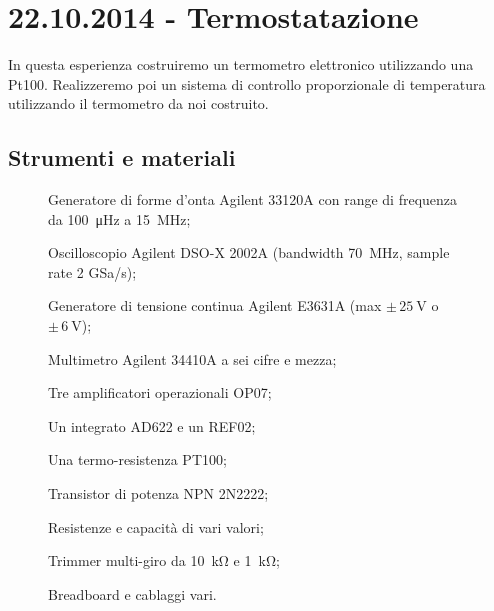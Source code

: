 \section{22.10.2014 - Termostatazione}

In questa esperienza costruiremo un termometro elettronico utilizzando una Pt100. Realizzeremo poi un sistema di controllo proporzionale di temperatura utilizzando il termometro da noi costruito. 

\subsection*{Strumenti e materiali}

\begin{figure}[htc]
\begin{itemize} [noitemsep]
	\item Generatore di forme d'onta Agilent 33120A con range di frequenza da \SI{100}{\micro\hertz} a \SI{15}{\mega\hertz};
	\item Oscilloscopio Agilent DSO-X 2002A (bandwidth \SI{70}{\mega\hertz}, sample rate \num{2} GSa/s);\newline
	\begin{minipage}{0.65\textwidth}
		\vspace{0.4mm}
		\item Generatore di tensione continua Agilent E3631A (max $\pm \, \SI{25}{\volt}$ o $\pm \, \SI{6}{\volt}$);
		\item Multimetro Agilent 34410A a sei cifre e mezza;
		\item Tre amplificatori operazionali OP07;
		\item Un integrato AD622 e un REF02;
		\item Una termo-resistenza PT100;
		\item Transistor di potenza NPN 2N2222;
		\item Resistenze e capacità di vari valori;
		\item Trimmer multi-giro da \SI{10}{\kilo\ohm} e \SI{1}{\kilo\ohm};
		\item Breadboard e cablaggi vari.

\end{minipage}
\end{itemize}
\end{figure}
